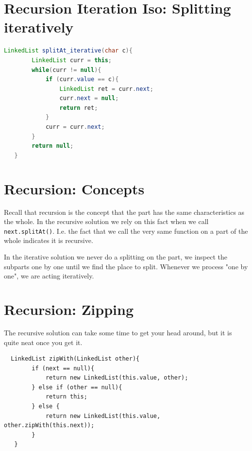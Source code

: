 \documentclass[twoside=false,DIV=14]{scrartcl}
\begin{document}
  \section{Recursion Iteration Iso: Splitting iteratively}
  \begin{lstlisting}[language=java]
    LinkedList splitAt_iterative(char c){
        LinkedList curr = this;
        while(curr != null){
            if (curr.value == c){
                LinkedList ret = curr.next;
                curr.next = null;
                return ret;
            }
            curr = curr.next;
        }
        return null;
   }
  \end{lstlisting}

  \section{Recursion: Concepts}
  Recall that recursion is the concept that the part has the same characteristics as the whole.  In the recursive solution we rely on this fact when we call \lstinline|next.splitAt()|.  I.e. the fact that we call the very same function on a part of the whole indicates it is recursive.  

  In the iterative solution we never do a splitting on the part, we inspect the subparts one by one until we find the place to split.  Whenever we process "one by one", we are acting iteratively.

  \section{Recursion: Zipping}
  The recursive solution can take some time to get your head around, but it is quite neat once you get it.
  \begin{lstlisting}
  LinkedList zipWith(LinkedList other){
        if (next == null){
            return new LinkedList(this.value, other);
        } else if (other == null){
            return this;
        } else {
            return new LinkedList(this.value, other.zipWith(this.next));
        }
   }
  \end{lstlisting}
\end{document}
